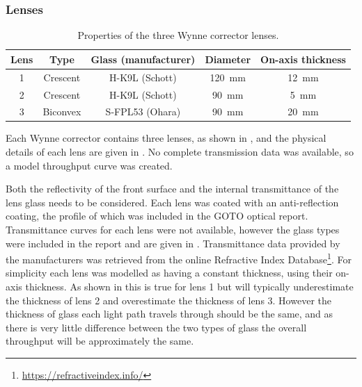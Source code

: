 \begin{colsection}
\begin{colsection}
\clearpage

\subsubsection{Lenses}

\begin{table}[t]
    \begin{center}
        \begin{tabular}{c|cccc} %
            Lens & Type     & Glass (manufacturer) & Diameter               & On-axis thickness \\
            \midrule
               1 & Crescent &    H-K9L (Schott)    & \SI{120}{\milli\meter} & \SI{12}{\milli\meter} \\
               2 & Crescent &    H-K9L (Schott)    & \SI{90}{\milli\meter}  & \SI{5}{\milli\meter} \\
               3 & Biconvex &  S-FPL53 (Ohara)     & \SI{90}{\milli\meter}  & \SI{20}{\milli\meter} \\
        \end{tabular}
    \end{center}
    \caption[Wynne corrector lens properties]{
        Properties of the three Wynne corrector lenses.
    }\label{tab:lenses}
\end{table}

Each Wynne corrector contains three lenses, as shown in , and the physical details of each lens are given in . No complete transmission data was available, so a model throughput curve was created.

Both the reflectivity of the front surface and the internal transmittance of the lens glass needs to be considered. Each lens was coated with an anti-reflection coating, the profile of which was included in the GOTO optical report. Transmittance curves for each lens were not available, however the glass types were included in the report and are given in . Transmittance data provided by the manufacturers was retrieved from the online Refractive Index Database\footnote{\url{https://refractiveindex.info/}}. For simplicity each lens was modelled as having a constant thickness, using their on-axis thickness. As shown in  this is true for lens 1 but will typically underestimate the thickness of lens 2 and overestimate the thickness of lens 3. However the thickness of glass each light path travels through should be the same, and as there is very little difference between the two types of glass the overall throughput will be approximately the same.


\end{colsection}
\end{colsection}

